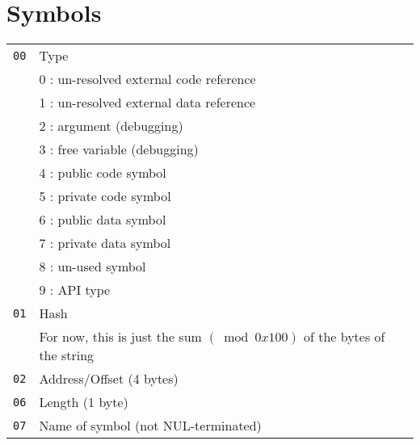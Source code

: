 \documentclass{article}
\begin{document}
\section{Symbols}

\begin{tabular}{rl}
  \texttt{00} & Type \\
  & 0 : un-resolved external code reference \\
  & 1 : un-resolved external data reference \\
  & 2 : argument (debugging) \\
  & 3 : free variable (debugging) \\
  & 4 : public code symbol \\
  & 5 : private code symbol \\
  & 6 : public data symbol \\
  & 7 : private data symbol \\
  & 8 : un-used symbol \\
  & 9 : API type \\
  \texttt{01} & Hash \\
  & For now, this is just the sum $(\bmod 0x100)$ of the bytes of the string \\
  \texttt{02} & Address/Offset (4 bytes) \\
  \texttt{06} & Length (1 byte) \\
  \texttt{07} & Name of symbol (not NUL-terminated) \\
\end{tabular}

\end{document}
